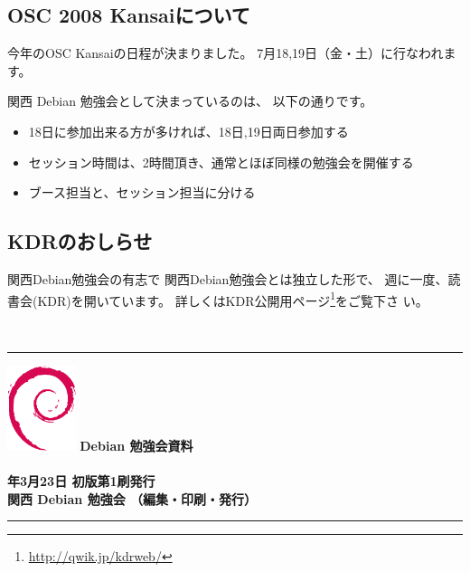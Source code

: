 \documentclass[mingoth,a4paper]{jsarticle}
\newcommand{\debmtgyear}{2008}
\newcommand{\debmtgdate}{23}
\newcommand{\debmtgmonth}{3}
\begin{document}
\subsection{OSC 2008 Kansaiについて}
今年のOSC Kansaiの日程が決まりました。
7月18,19日（金・土）に行なわれます。

関西 Debian 勉強会として決まっているのは、
以下の通りです。

\begin{itemize}
 \item 18日に参加出来る方が多ければ、18日,19日両日参加する
 \item セッション時間は、2時間頂き、通常とほぼ同様の勉強会を開催する
 \item ブース担当と、セッション担当に分ける
\end{itemize}

\subsection{KDRのおしらせ}
関西Debian勉強会の有志で
関西Debian勉強会とは独立した形で、
週に一度、読書会(KDR)を開いています。
詳しくはKDR公開用ページ\footnote{\url{http://qwik.jp/kdrweb/}}をご覧下さ
い。


\mbox{}\newpage
　
\printindex
 \cleartooddpage

 \begin{minipage}[b]{0.2\hsize}
 \end{minipage}
 \begin{minipage}[b]{0.8\hsize}

 \vspace*{15cm}
 \rule{\hsize}{1mm}
 \vspace{2mm}
 \includegraphics[width=2cm]{image200502/openlogo-nd.eps}
 \noindent \Large \bf Debian 勉強会資料\\ \\
 \noindent \normalfont \debmtgyear{}年\debmtgmonth{}月\debmtgdate{}日 \hspace{5mm}  初版第1刷発行\\
 \noindent \normalfont 関西 Debian 勉強会 （編集・印刷・発行）\\
 \rule{\hsize}{1mm}
 \end{minipage}
\end{document}
